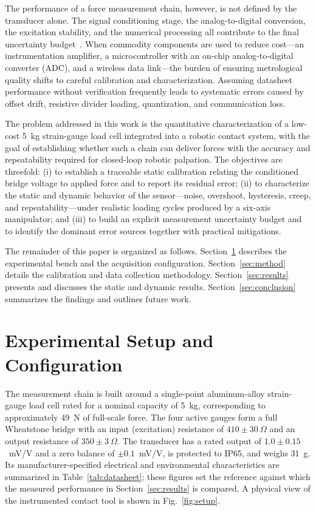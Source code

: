\documentclass[conference]{IEEEtran}
\begin{document}
The performance of a force measurement chain, however, is not defined by the transducer alone. The signal conditioning stage, the analog-to-digital conversion, the excitation stability, and the numerical processing all contribute to the final uncertainty budget~\cite{b3}. When commodity components are used to reduce cost---an instrumentation amplifier, a microcontroller with an on-chip analog-to-digital converter (ADC), and a wireless data link---the burden of ensuring metrological quality shifts to careful calibration and characterization. Assuming datasheet performance without verification frequently leads to systematic errors caused by offset drift, resistive divider loading, quantization, and communication loss.

The problem addressed in this work is the quantitative characterization of a low-cost 5~kg strain-gauge load cell integrated into a robotic contact system, with the goal of establishing whether such a chain can deliver forces with the accuracy and repeatability required for closed-loop robotic palpation. The objectives are threefold: (i) to establish a traceable static calibration relating the conditioned bridge voltage to applied force and to report its residual error; (ii) to characterize the static and dynamic behavior of the sensor---noise, overshoot, hysteresis, creep, and repeatability---under realistic loading cycles produced by a six-axis manipulator; and (iii) to build an explicit measurement uncertainty budget and to identify the dominant error sources together with practical mitigations.

The remainder of this paper is organized as follows. Section~\ref{sec:setup} describes the experimental bench and the acquisition configuration. Section~\ref{sec:method} details the calibration and data collection methodology. Section~\ref{sec:results} presents and discusses the static and dynamic results. Section~\ref{sec:conclusion} summarizes the findings and outlines future work.

\section{Experimental Setup and Configuration}\label{sec:setup}
The measurement chain is built around a single-point aluminum-alloy strain-gauge load cell rated for a nominal capacity of 5~kg, corresponding to approximately 49~N of full-scale force. The four active gauges form a full Wheatstone bridge with an input (excitation) resistance of $410\pm30~\Omega$ and an output resistance of $350\pm3~\Omega$. The transducer has a rated output of $1.0\pm0.15$~mV/V and a zero balance of $\pm0.1$~mV/V, is protected to IP65, and weighs 31~g. Its manufacturer-specified electrical and environmental characteristics are summarized in Table~\ref{tab:datasheet}; these figures set the reference against which the measured performance in Section~\ref{sec:results} is compared. A physical view of the instrumented contact tool is shown in Fig.~\ref{fig:setup}.
\end{document}
